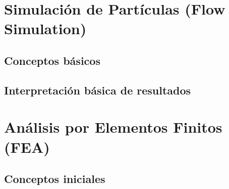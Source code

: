 \section{Simulación de Partículas (Flow Simulation)}

\subsection{Conceptos básicos}


\subsection{Interpretación básica de resultados}

\section{Análisis por Elementos Finitos (FEA)}

\subsection{Conceptos iniciales}

